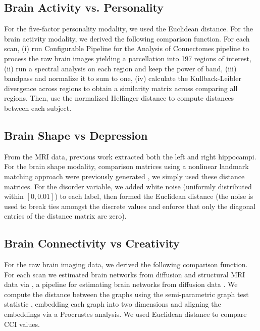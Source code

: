 \documentclass[11pt]{article}
\begin{document}
\subsection{Brain Activity vs. Personality}

For the five-factor personality modality, we  used the Euclidean distance. For the brain activity modality,
we derived the following comparison function. For each scan, (i) run Configurable Pipeline for the
 Analysis of Connectomes pipeline \cite{CPAC2015} to process the raw brain images yielding a parcellation into
197 regions of interest, 
(ii) run a spectral analysis on each region and keep the power of band, 
(iii) bandpass and normalize it to sum to one, 
(iv) calculate the Kullback-Leibler divergence across regions to obtain a similarity matrix across comparing all regions. 
Then, use the normalized Hellinger distance to compute distances between each subject.

\subsection{Brain Shape vs Depression}

From the MRI data, previous work extracted both the left and right hippocampi. For the brain shape modality, comparison matrices using a nonlinear landmark matching approach were previously generated \cite{ParkEtAl2008,BegEtAl2005}, we simply used these distance matrices. For the disorder variable, we added white noise (uniformly distributed within $[0,0.01]$) to each label,
then formed the Euclidean distance (the noise is used to break ties amongst the discrete values and enforce that only the diagonal entries of the distance matrix are zero).

\subsection{Brain Connectivity vs Creativity}


For the raw brain imaging data, we derived the following comparison function.  For each scan we estimated brain networks from diffusion and structural MRI data via  \Migraine, a pipeline for estimating brain networks from diffusion data \cite{GrayRoncal2013}.
We compute the distance between the graphs using the semi-parametric graph test statistic \cite{Sussman2013,ShenVogelsteinPriebe2016,Tang2016}, embedding each graph into two dimensions and aligning the embeddings via a Procrustes analysis. We used Euclidean distance to compare CCI values. 
\end{document}
